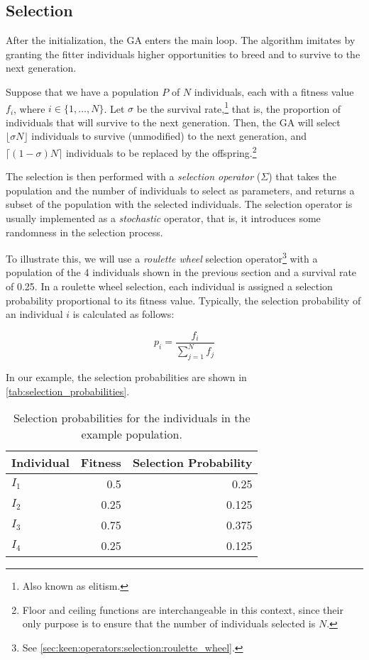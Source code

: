 \subsection{Selection}
\label{sec:genetic_algorithms:selection}
  After the initialization, the GA enters the main loop.
  The algorithm imitates by granting the fitter individuals higher opportunities to breed and to
  survive to the next generation.

  Suppose that we have a population \(P\) of \(N\) individuals, each with a fitness value \(f_i\),
  where \(i \in \{1, \ldots, N\}\).
  Let \(\sigma\) be the survival rate,\footnote{Also known as elitism.} that is, the proportion of 
  individuals that will survive to the next generation.
  Then, the GA will select \(\lfloor\sigma N\rfloor\) individuals to survive (unmodified) to the 
  next generation, and \(\lceil(1 - \sigma)N\rceil\) individuals to be replaced by the 
  offspring.\footnote{Floor and ceiling functions are interchangeable in this context, since their
  only purpose is to ensure that the number of individuals selected is \(N\).}

  The selection is then performed with a \emph{selection operator} (\(\Sigma\)) that takes the 
  population and the number of individuals to select as parameters, and returns a subset of the
  population with the selected individuals.
  The selection operator is usually implemented as a \emph{stochastic} operator, that is, it
  introduces some randomness in the selection process.

  To illustrate this, we will use a \textit{roulette wheel} selection operator\footnote{
    See \vref{sec:keen:operators:selection:roulette_wheel}.
  } with a population of the 4 individuals shown in the previous section and a survival rate of 
  0.25.
  In a roulette wheel selection, each individual is assigned a selection probability proportional
  to its fitness value.
  Typically, the selection probability of an individual \(i\) is calculated as follows:

  \begin{equation}
    \label{eq:selection_probability}
    p_i = \frac{f_i}{\sum_{j=1}^{N}f_j}
  \end{equation}

  In our example, the selection probabilities are shown in \vref{tab:selection_probabilities}.

  \begin{table}[ht!]
    \centering
    \begin{tabular}{|l|r|r|}
      \hline
      Individual & Fitness & Selection Probability \\
      \hline
      \(I_1\) & 0.5 & 0.25 \\
      \(I_2\) & 0.25 & 0.125 \\
      \(I_3\) & 0.75 & 0.375 \\
      \(I_4\) & 0.25 & 0.125 \\
      \hline
    \end{tabular}
    \caption{Selection probabilities for the individuals in the example population.}
    \label{tab:selection_probabilities}
  \end{table}

